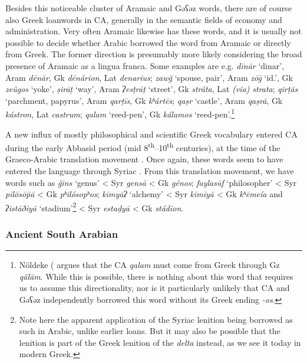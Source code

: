 \documentclass[output=paper]{langsci/langscibook}
\begin{document}
Besides this noticeable cluster of Aramaic and Gəʕəz words, there are of course also Greek loanwords in CA, generally in the semantic fields of economy and administration. Very often Aramaic likewise has these words, and it is usually not possible to decide whether Arabic borrowed the word from Aramaic or directly from Greek. The former direction is presumably more likely considering the broad presence of Aramaic as a lingua franca. Some examples are e.g. \textit{dīnār} ‘dinar’, Aram \textit{dēnār}, Gk \textit{dēnárion}, Lat \textit{denarius}; \textit{zawǧ} ‘spouse, pair’, Aram \textit{zōḡ} ‘id.’, Gk \textit{zeûgos} ‘yoke’, \textit{ṣirāṭ} ‘way’, Aram \textit{ʔesṭrāṭ} ‘street’, Gk \textit{stráta}, Lat \textit{(via)} \textit{strata}; \textit{qirṭās} ‘parchment, papyrus’, Aram \textit{qarṭīs}, Gk \textit{kʰártēs}; \textit{qaṣr} ‘castle’, Aram \textit{qaṣrā}, Gk \textit{kástron}, Lat \textit{castrum}; \textit{qalam} ‘reed-pen’, Gk \textit{kálamos} ‘reed-pen’.\footnote{Nöldeke (\citeyear[50]{Nöldeke1910} argues that the CA \textit{qalam} must come from Greek through Gz \textit{qäläm}. While this is possible, there is nothing about this word that requires us to assume this directionality, nor is it particularly unlikely that CA and Gəʕəz independently borrowed this word without its Greek ending \textit{-os}.}

A new influx of mostly philosophical and scientific Greek vocabulary entered CA during the early Abbasid period (mid 8\textsuperscript{th}–10\textsuperscript{th} centuries), at the time of the Graeco-Arabic translation movement \citep{Gutas1998}. Once again, these words seem to have entered the language through Syriac \citep{Gutas2011}. From this translation movement, we have words such as \textit{ǧins} ‘genus’ < Syr \textit{gensā} < Gk \textit{génos}; \textit{faylasūf} ‘philosopher’ < Syr \textit{pīlōsō\={p}ā} < Gk \textit{pʰilósopʰos}; \textit{kīmyāʔ} ‘alchemy’ < Syr \textit{kīmīyā} < Gk \textit{kʰēmeía} and \textit{ʔistāðiyā} ‘stadium’\footnote{Note here the apparent application of the Syriac lenition being borrowed as such in Arabic, unlike earlier loans. But it may also be possible that the lenition is part of the Greek lenition of the \textit{delta} instead, as we see it today in modern Greek.} < Syr \textit{estaḏyā} < Gk \textit{stádion}.

\subsubsection{\label{bkm:Ref13224682}Ancient South Arabian}
\end{document}
